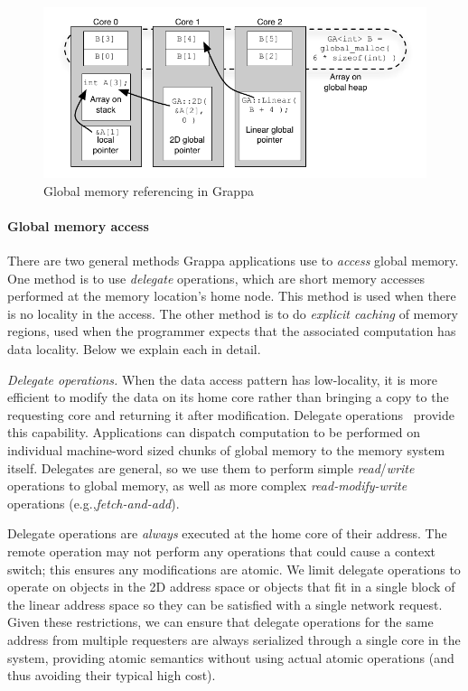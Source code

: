 \begin{figure}[t]
\begin{center}
  \includegraphics[width=0.95\columnwidth]{figs/memory-structure}
\begin{minipage}{0.95\columnwidth}
  \caption{\label{fig:memory-structure} Global memory referencing in Grappa}
\end{minipage}
\vspace{-3ex}
\end{center}
\end{figure}

\paragraph{Global memory access} There are two general methods Grappa
applications use to {\em access} global memory. One method is to use {\em
delegate} operations, which are short memory accesses performed at the memory
location's home node. This method is used when there is no locality in the
access. The other method is to do {\em explicit caching} of memory regions,
used when the programmer expects that the associated computation has data
locality. Below we explain each in detail.


\vspace{1ex} \textit{Delegate operations.} When the data access pattern has
low-locality, it is more efficient to modify the data on its home core rather
than bringing a copy to the requesting core and returning it after
modification. Delegate operations~\cite{Nelson:hotpar11, delegated:oopsla11}
provide this capability. Applications can dispatch computation to be performed
on individual machine-word sized chunks of global memory to the memory system
itself. Delegates are general, so we use them to perform simple
\emph{read}/\emph{write} operations to global memory, as well as more complex \emph{read-modify-write} operations (e.g.,\emph{fetch-and-add}). 

Delegate operations are \emph{always} executed at the home core of their
address. The remote operation may not perform any operations that could cause
a context switch; this ensures any modifications are atomic. We limit delegate
operations to operate on objects in the 2D address space or objects that fit
in a single block of the linear address space so they can be satisfied with a
single network request. Given these restrictions, we can ensure that delegate
operations for the same address from multiple requesters are always serialized
through a single core in the system, providing atomic semantics without using
actual atomic operations (and thus avoiding their typical high cost).

